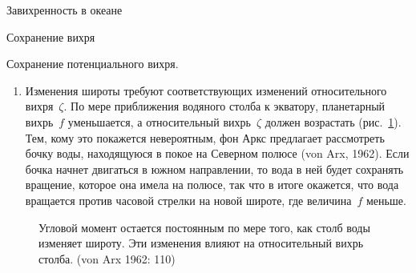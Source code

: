 \begin{chapter}{Завихренность в океане}
\begin{section}{Сохранение вихря}
\begin{paragraph}{Сохранение потенциального вихря.}
\begin{enumerate}
\item
Изменения широты требуют соответствующих изменений относительного 
вихря~$\zeta$. По мере приближения водяного столба к экватору,
планетарный вихрь~$f$ уменьшается, а относительный вихрь~$\zeta$
должен возрастать (рис.~\ref{fig:planetaryvorticity}). Тем, кому это покажется 
невероятным, фон Аркс предлагает рассмотреть бочку воды, находящуюся в покое 
на Северном полюсе (von Arx, 1962). Если бочка начнет двигаться в южном 
направлении, то вода в ней будет сохранять вращение, которое она имела на 
полюсе, так что в итоге окажется, что вода вращается против часовой стрелки 
на новой широте, где величина~$f$ меньше.
%
\end{enumerate}
\begin{figure}[b!]
\begin{center}
\end{center}
\caption{Угловой момент остается постоянным по мере того, как столб
воды изменяет широту. Эти изменения влияют на относительный вихрь столба. 
(von Arx 1962: 110)}
\label{fig:planetaryvorticity}
\end{figure}
%

\end{paragraph}
\end{section}
\end{chapter}
